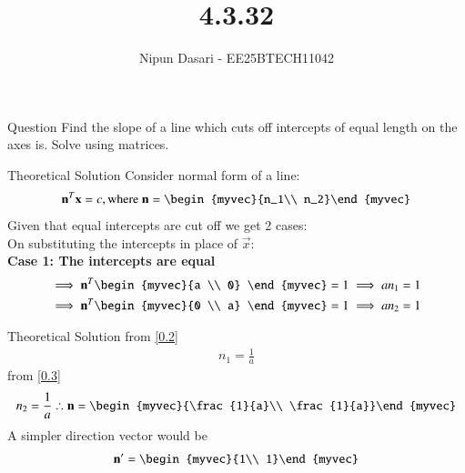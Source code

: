 \documentclass{beamer}
\title %
{4.3.32}
\author %
{Nipun Dasari - EE25BTECH11042}
\begin{document}
	
	\frame{\titlepage}
	\begin{frame}{Question}
		Find the slope of a line which cuts off intercepts of equal length on the axes is. Solve using matrices. \\
	\end{frame}
	
	
	\begin{frame}{Theoretical Solution}
	Consider normal form of a line:
	\begin{align}
		\vec{n}^T\vec{x} = c, \text{where } \vec{n} = \begin{myvec}{n_1\\ n_2}\end{myvec}
	\end{align}
	Given that equal intercepts are cut off we get 2 cases:\\
	On substituting the intercepts in place of $\vec{x}$: \\
	\textbf{Case 1: The intercepts are equal }
	\begin{align}
		\implies  \vec{n}^T\begin{myvec}{a \\ 0} \end{myvec} = 1 \implies an_1 = 1 \label{0.2}\\
		\implies \vec{n}^T\begin{myvec}{0 \\ a} \end{myvec} = 1 \implies an_2 = 1 \label{0.3} \\
	\end{align}
	\end{frame}
	\begin{frame}{Theoretical Solution}
			from \eqref{0.2}
		\begin{align}
			n_1 = \frac{1}{a} 
		\end{align}
		from \eqref{0.3}
		\begin{align}
			n_2 = \frac{1}{a}
			\therefore \vec{n} = \begin{myvec}{\frac{1}{a}\\ \frac{1}{a}}\end{myvec}	
		\end{align}
		A simpler direction vector would be
		\begin{align}
			\vec{n'} = 	\begin{myvec}{1\\ 1}\end{myvec}
		\end{align}
	\end{frame}
\end{document}
